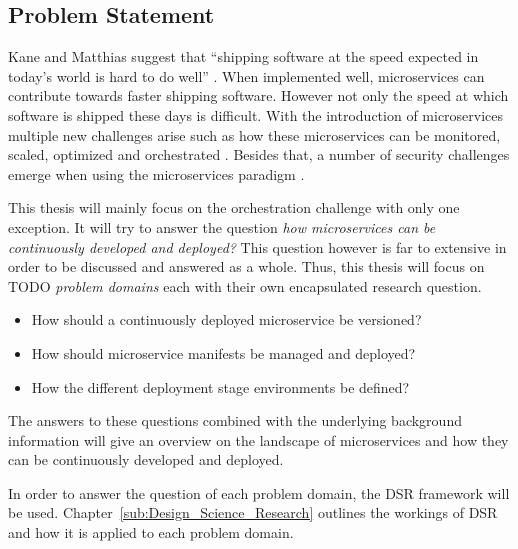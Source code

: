 
\subsection{Problem Statement}%
\label{sub:Problem_Statement}

Kane and Matthias suggest that \enquote{shipping software at the speed expected
in today's world is hard to do well} \autocite[p.
2]{SeanPKaneDocker&Running2018}. When implemented well, microservices can
contribute towards faster shipping software. However not only the speed at
which software is shipped these days is difficult. With the introduction of
microservices multiple new challenges arise such as how these microservices can
be monitored, scaled, optimized and orchestrated \autocite[p.
67]{TrihinasDevOpsasService2018}. Besides that, a number of security challenges
emerge when using the microservices paradigm
\autocite{YaryginaOvercomingSecurityChallenges2018}.

This thesis will mainly focus on the orchestration challenge with only one
exception. It will try to answer the question \textit{how microservices can be
continuously developed and deployed?} This question however is far to extensive
in order to be discussed and answered as a whole. Thus, this thesis will focus
on TODO \textit{problem domains} each with their own encapsulated research
question.

\begin{itemize}
  \item How should a continuously deployed microservice be versioned?
  \item How should microservice manifests be managed and deployed?
  \item How the different deployment stage environments be defined?
\end{itemize}

The answers to these questions combined with the underlying background
information will give an overview on the landscape of microservices and how
they can be continuously developed and deployed.

In order to answer the question of each problem domain, the \ac{DSR} framework
will be used. Chapter~\ref{sub:Design_Science_Research} outlines the workings
of \ac{DSR} and how it is applied to each problem domain.
